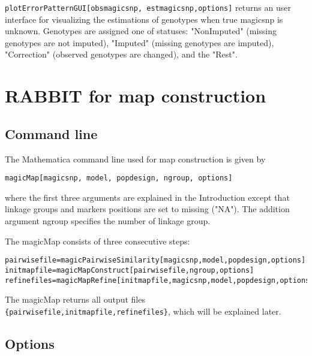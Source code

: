 \documentclass[12pt]{article}
\begin{document}
\verb|plotErrorPatternGUI[obsmagicsnp, estmagicsnp,options]| returns an user interface for visualizing the estimations of genotypes when true magicsnp is unknown. Genotypes are assigned one of statuses: "NonImputed" (missing genotypes are not imputed), "Imputed" (missing genotypes are imputed), "Correction" (observed genotypes are changed), and  the "Rest". 

\section{RABBIT for map construction}
\subsection{Command line}
The Mathematica command line used for map construction is given by
\begin{verbatim}
magicMap[magicsnp, model, popdesign, ngroup, options]
\end{verbatim}
where the first three arguments are explained in the Introduction except that linkage groups and markers positions are set to missing ("NA"). The addition argument ngroup specifies the number of linkage group. 

The magicMap consists of three consecutive steps: 

\begin{verbatim}
pairwisefile=magicPairwiseSimilarity[magicsnp,model,popdesign,options]
initmapfile=magicMapConstruct[pairwisefile,ngroup,options]
refinefiles=magicMapRefine[initmapfile,magicsnp,model,popdesign,options]
\end{verbatim} 

The magicMap returns all output files \verb|{pairwisefile,initmapfile,refinefiles}|, which will be explained later. 

\subsection{Options}
\end{document}
